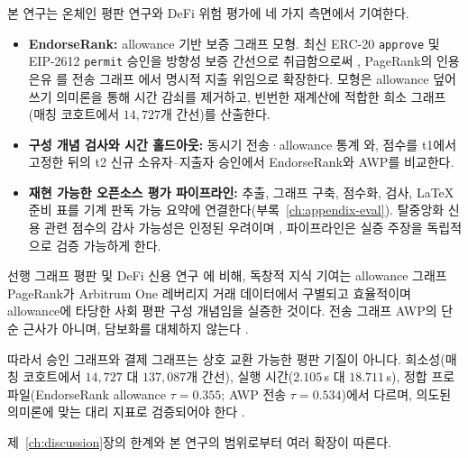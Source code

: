 
본 연구는 온체인 평판 연구와 DeFi 위험 평가에 네 가지 측면에서 기여한다.
\begin{itemize}
\item \textbf{EndorseRank:} allowance 기반 보증 그래프 모형. 최신 ERC-20 \texttt{approve} 및 EIP-2612 \texttt{permit} 승인을 방향성 보증 간선으로 취급함으로써 , PageRank의 인용 은유 를 전송 그래프 에서 명시적 지출 위임으로 확장한다. 모형은 allowance 덮어쓰기 의미론을 통해 시간 감쇠를 제거하고, 빈번한 재계산에 적합한 희소 그래프(매칭 코호트에서 $14{,}727$개 간선)를 산출한다.
\item \textbf{구성 개념 검사와 시간 홀드아웃:} 동시기 전송·allowance 통계 와, 점수를 t1에서 고정한 뒤의 t2 신규 소유자--지출자 승인에서 EndorseRank와 AWP를 비교한다.
\item \textbf{재현 가능한 오픈소스 평가 파이프라인:} 추출, 그래프 구축, 점수화, 검사, LaTeX 준비 표를 기계 판독 가능 요약에 연결한다(부록~\ref{ch:appendix-eval}). 탈중앙화 신용 관련 점수의 감사 가능성은 인정된 우려이며 , 파이프라인은 실증 주장을 독립적으로 검증 가능하게 한다.
\end{itemize}

선행 그래프 평판 및 DeFi 신용 연구 에 비해, 독창적 지식 기여는 allowance 그래프 PageRank가 Arbitrum One 레버리지 거래 데이터에서 구별되고 효율적이며 allowance에 타당한 사회 평판 구성 개념임을 실증한 것이다. 전송 그래프 AWP의 단순 근사가 아니며, 담보화를 대체하지 않는다 .

따라서 승인 그래프와 결제 그래프는 상호 교환 가능한 평판 기질이 아니다. 희소성(매칭 코호트에서 $14{,}727$ 대 $137{,}087$개 간선), 실행 시간($2.105$\,s 대 $18.711$\,s), 정합 프로파일(EndorseRank allowance $\tau=0.355$; AWP 전송 $\tau=0.534$)에서 다르며, 의도된 의미론에 맞는 대리 지표로 검증되어야 한다 .


제~\ref{ch:discussion}장의 한계와 본 연구의 범위로부터 여러 확장이 따른다.

